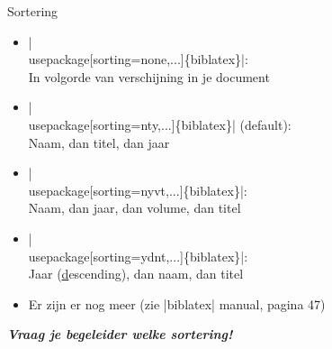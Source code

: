 
\begin{frame}{Sortering}
	\begin{itemize}[label=\textbullet]
		\item \hll|\\usepackage[sorting=none,...]\{biblatex\}|: \\
		In volgorde van verschijning in je document

		\item \hll|\\usepackage[sorting=nty,...]\{biblatex\}| (default):\\
		Naam, dan titel, dan jaar

		\item \hll|\\usepackage[sorting=nyvt,...]\{biblatex\}|:\\
		Naam, dan jaar, dan volume, dan titel

		\item \hll|\\usepackage[sorting=ydnt,...]\{biblatex\}|:\\
		Jaar (\underline{d}escending), dan naam, dan titel

		\item Er zijn er nog meer (zie \hll|biblatex| manual, pagina 47)
	\end{itemize}

	\pause
	{\large\itshape\bfseries Vraag je begeleider welke sortering!}
\end{frame}
